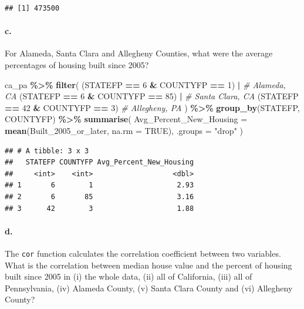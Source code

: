 \documentclass[
]{article}
\newenvironment{Shaded}{\begin{snugshade}}{\end{snugshade}}
\newcommand{\AttributeTok}[1]{\textcolor[rgb]{0.13,0.29,0.53}{#1}}
\newcommand{\CommentTok}[1]{\textcolor[rgb]{0.56,0.35,0.01}{\textit{#1}}}
\newcommand{\ConstantTok}[1]{\textcolor[rgb]{0.56,0.35,0.01}{#1}}
\newcommand{\DecValTok}[1]{\textcolor[rgb]{0.00,0.00,0.81}{#1}}
\newcommand{\FunctionTok}[1]{\textcolor[rgb]{0.13,0.29,0.53}{\textbf{#1}}}
\newcommand{\NormalTok}[1]{#1}
\newcommand{\SpecialCharTok}[1]{\textcolor[rgb]{0.81,0.36,0.00}{\textbf{#1}}}
\newcommand{\StringTok}[1]{\textcolor[rgb]{0.31,0.60,0.02}{#1}}
\begin{document}
\begin{verbatim}
## [1] 473500
\end{verbatim}

\paragraph{c.}\label{c.-2}

For Alameda, Santa Clara and Allegheny Counties, what were the average
percentages of housing built since 2005?

\begin{Shaded}
\begin{Highlighting}[]
\NormalTok{ca\_pa }\SpecialCharTok{\%\textgreater{}\%}
  \FunctionTok{filter}\NormalTok{(}
\NormalTok{    (STATEFP }\SpecialCharTok{==} \DecValTok{6} \SpecialCharTok{\&}\NormalTok{ COUNTYFP }\SpecialCharTok{==} \DecValTok{1}\NormalTok{) }\SpecialCharTok{|}    \CommentTok{\# Alameda, CA}
\NormalTok{    (STATEFP }\SpecialCharTok{==} \DecValTok{6} \SpecialCharTok{\&}\NormalTok{ COUNTYFP }\SpecialCharTok{==} \DecValTok{85}\NormalTok{) }\SpecialCharTok{|}   \CommentTok{\# Santa Clara, CA}
\NormalTok{    (STATEFP }\SpecialCharTok{==} \DecValTok{42} \SpecialCharTok{\&}\NormalTok{ COUNTYFP }\SpecialCharTok{==} \DecValTok{3}\NormalTok{)     }\CommentTok{\# Allegheny, PA}
\NormalTok{  ) }\SpecialCharTok{\%\textgreater{}\%}
  \FunctionTok{group\_by}\NormalTok{(STATEFP, COUNTYFP) }\SpecialCharTok{\%\textgreater{}\%}
  \FunctionTok{summarise}\NormalTok{(}
    \AttributeTok{Avg\_Percent\_New\_Housing =} \FunctionTok{mean}\NormalTok{(Built\_2005\_or\_later, }\AttributeTok{na.rm =} \ConstantTok{TRUE}\NormalTok{),}
    \AttributeTok{.groups =} \StringTok{"drop"}
\NormalTok{  )}
\end{Highlighting}
\end{Shaded}

\begin{verbatim}
## # A tibble: 3 x 3
##   STATEFP COUNTYFP Avg_Percent_New_Housing
##     <int>    <int>                   <dbl>
## 1       6        1                    2.93
## 2       6       85                    3.16
## 3      42        3                    1.88
\end{verbatim}

\paragraph{d.}\label{d.-1}

The \texttt{cor} function calculates the correlation coefficient between
two variables. What is the correlation between median house value and
the percent of housing built since 2005 in (i) the whole data, (ii) all
of California, (iii) all of Pennsylvania, (iv) Alameda County, (v) Santa
Clara County and (vi) Allegheny County?
\end{document}
